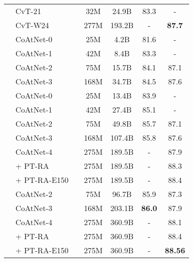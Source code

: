 \documentclass{article}
\newcommand{\name}{CoAtNet\xspace}
\begin{document}
\begin{table}[!ht]
\begin{tabular}{c l c c c c c}
        & CvT-21   &  & 32M &  24.9B & 83.3 & - \\
        & CvT-W24   &  & 277M &  193.2B & - & \bf 87.7 \\
        \midrule
        & \name-0 &  & 25M  & 4.2B & 81.6 & - \\
        & \name-1 &  & 42M  & 8.4B & 83.3 & -  \\
        & \name-2 &  & 75M  & 15.7B & 84.1 & 87.1 \\
        & \name-3 &  & 168M & 34.7B & 84.5 & 87.6 \\
        \cmidrule(lr){2-2} \cmidrule(lr){3-3} \cmidrule(lr){4-5} \cmidrule(l){6-6} \cmidrule(l){7-7}
        & \name-0 &  & 25M  & 13.4B & 83.9  & - \\
        & \name-1 &  & 42M  & 27.4B & 85.1  & - \\
        & \name-2 &  & 75M  & 49.8B & 85.7 & 87.1 \\
        & \name-3 &  & 168M & 107.4B & 85.8 & 87.6\\
        & \name-4 &  & 275M & 189.5B & - & 87.9 \\
        & \quad + PT-RA &  & 275M & 189.5B & - & 88.3 \\
        & \quad + PT-RA-E150 &  & 275M & 189.5B & - & 88.4 \\
        \cmidrule(lr){2-2} \cmidrule(lr){3-3} \cmidrule(lr){4-5} \cmidrule(l){6-6} \cmidrule(l){7-7}
        & \name-2 &  & 75M  & 96.7B & 85.9 & 87.3 \\
        & \name-3 &  & 168M & 203.1B  & \bf 86.0 & 87.9 \\
        & \name-4 &  & 275M & 360.9B & - &  88.1 \\
        & \quad + PT-RA &  & 275M & 360.9B & - & 88.4 \\
        & \quad + PT-RA-E150 &  & 275M & 360.9B & - & \bf 88.56 \\
        \bottomrule
    \end{tabular}
    \label{tab:i1k21k_result}
\end{table}
\end{document}
